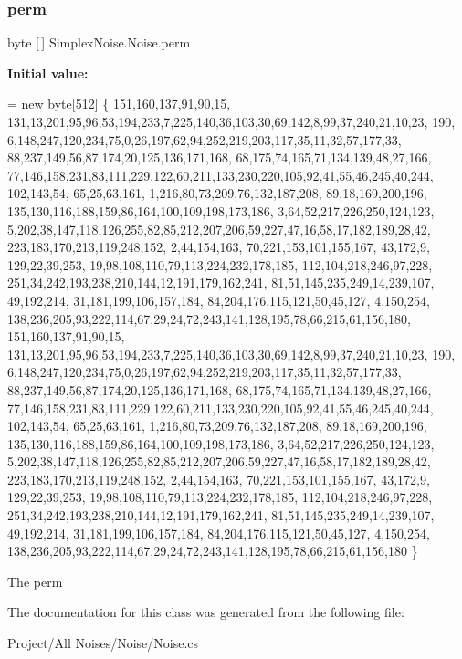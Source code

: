 \subsubsection{\texorpdfstring{perm}{perm}}
{\footnotesize\ttfamily byte \mbox{[}$\,$\mbox{]} Simplex\+Noise.\+Noise.\+perm\hspace{0.3cm}{\ttfamily [static]}}

{\bfseries Initial value\+:}
\begin{DoxyCode}
= \textcolor{keyword}{new} byte[512] \{ 151,160,137,91,90,15,
              131,13,201,95,96,53,194,233,7,225,140,36,103,30,69,142,8,99,37,240,21,10,23,
              190, 6,148,247,120,234,75,0,26,197,62,94,252,219,203,117,35,11,32,57,177,33,
              88,237,149,56,87,174,20,125,136,171,168, 68,175,74,165,71,134,139,48,27,166,
              77,146,158,231,83,111,229,122,60,211,133,230,220,105,92,41,55,46,245,40,244,
              102,143,54, 65,25,63,161, 1,216,80,73,209,76,132,187,208, 89,18,169,200,196,
              135,130,116,188,159,86,164,100,109,198,173,186, 3,64,52,217,226,250,124,123,
              5,202,38,147,118,126,255,82,85,212,207,206,59,227,47,16,58,17,182,189,28,42,
              223,183,170,213,119,248,152, 2,44,154,163, 70,221,153,101,155,167, 43,172,9,
              129,22,39,253, 19,98,108,110,79,113,224,232,178,185, 112,104,218,246,97,228,
              251,34,242,193,238,210,144,12,191,179,162,241, 81,51,145,235,249,14,239,107,
              49,192,214, 31,181,199,106,157,184, 84,204,176,115,121,50,45,127, 4,150,254,
              138,236,205,93,222,114,67,29,24,72,243,141,128,195,78,66,215,61,156,180,
              151,160,137,91,90,15,
              131,13,201,95,96,53,194,233,7,225,140,36,103,30,69,142,8,99,37,240,21,10,23,
              190, 6,148,247,120,234,75,0,26,197,62,94,252,219,203,117,35,11,32,57,177,33,
              88,237,149,56,87,174,20,125,136,171,168, 68,175,74,165,71,134,139,48,27,166,
              77,146,158,231,83,111,229,122,60,211,133,230,220,105,92,41,55,46,245,40,244,
              102,143,54, 65,25,63,161, 1,216,80,73,209,76,132,187,208, 89,18,169,200,196,
              135,130,116,188,159,86,164,100,109,198,173,186, 3,64,52,217,226,250,124,123,
              5,202,38,147,118,126,255,82,85,212,207,206,59,227,47,16,58,17,182,189,28,42,
              223,183,170,213,119,248,152, 2,44,154,163, 70,221,153,101,155,167, 43,172,9,
              129,22,39,253, 19,98,108,110,79,113,224,232,178,185, 112,104,218,246,97,228,
              251,34,242,193,238,210,144,12,191,179,162,241, 81,51,145,235,249,14,239,107,
              49,192,214, 31,181,199,106,157,184, 84,204,176,115,121,50,45,127, 4,150,254,
              138,236,205,93,222,114,67,29,24,72,243,141,128,195,78,66,215,61,156,180
            \}
\end{DoxyCode}


The perm 



The documentation for this class was generated from the following file\+:\begin{DoxyCompactItemize}
\item 
Project/\+All Noises/\+Noise/Noise.\+cs\end{DoxyCompactItemize}
